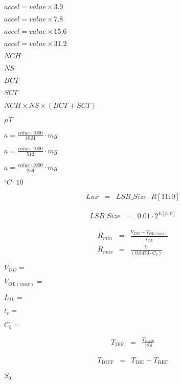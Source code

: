 \documentclass{article}
\begin{document}
$ accel = {value \times 3.9} $
\pagebreak

$ accel = {value \times 7.8} $
\pagebreak

$ accel = {value \times 15.6} $
\pagebreak

$ accel = {value \times 31.2} $
\pagebreak

$NCH$
\pagebreak

$NS$
\pagebreak

$BCT$
\pagebreak

$SCT$
\pagebreak

$ NCH \times NS \times (BCT + SCT) $
\pagebreak

$\mu T$
\pagebreak

$ a = \frac{value \cdot 1000}{1024} \cdot mg $
\pagebreak

$ a = \frac{value \cdot 1000}{512} \cdot mg $
\pagebreak

$ a = \frac{value \cdot 1000}{256} \cdot mg $
\pagebreak

$^\circ C \cdot 10$
\pagebreak

\begin{eqnarray*}
        Lux &=& LSB\_Size \cdot R[11:0]
    \end{eqnarray*}
\pagebreak

\begin{eqnarray*}
        LSB\_Size &=& 0.01 \cdot 2^{E[3:0]}
    \end{eqnarray*}
\pagebreak

\begin{eqnarray*}
R_{min} &=& \frac{V_{DD} - V_{OL(max)}} {I_{OL}}\\
R_{max} &=& \frac{t_r} {(0.8473 \cdot C_b)}
\end{eqnarray*}
\pagebreak

$ V_{DD} =$
\pagebreak

$ V_{OL(max)} =$
\pagebreak

$ I_{OL} =$
\pagebreak

$ t_r =$
\pagebreak

$ C_b =$
\pagebreak

\begin{eqnarray*}
        T_{\mathrm{DIE}} &=& \frac{T_{\mathrm{RAW}}}{128}
    \end{eqnarray*}
\pagebreak

\begin{eqnarray*}
        T_{\mathrm{DIFF}} &=& T_{\mathrm{DIE}} - T_{\mathrm{REF}}
    \end{eqnarray*}
\pagebreak

$S_{\mathrm{0}}$
\pagebreak
\end{document}
